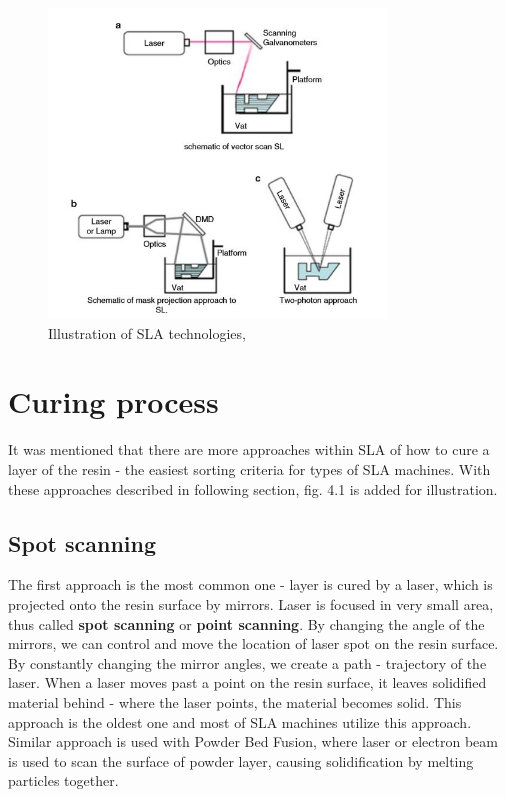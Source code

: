 \documentclass[a4paper, twoside, 11pt]{report}
\begin{document}
\begin{figure}[t]
  \centering
  \includegraphics[width=0.8\textwidth]{SLAillustration}
  \caption{Illustration of SLA technologies, \cite[p. 65]{AMT}}
\end{figure}
%
\section{Curing process} 
It was mentioned that there are more approaches within SLA of how to cure a layer of the resin - the easiest sorting criteria for types of SLA machines. With these approaches described in following section, fig. 4.1 is added for illustration.
\subsection{Spot scanning}
The first approach is the most common one - layer is cured by a laser, which is projected onto the resin surface by mirrors. Laser is focused in very small area, thus called \textbf{spot scanning} or \textbf{point scanning}. By changing the angle of the mirrors, we can control and move the location of laser spot on the resin surface. By constantly changing the mirror angles, we create a path - trajectory of the laser. When a laser moves past a point on the resin surface, it leaves solidified material behind - where the laser points, the material becomes solid. This approach is the oldest one and most of SLA machines utilize this approach. Similar approach is used with Powder Bed Fusion, where laser or electron beam is used to scan the surface of powder layer, causing solidification by melting particles together.
\end{document}
